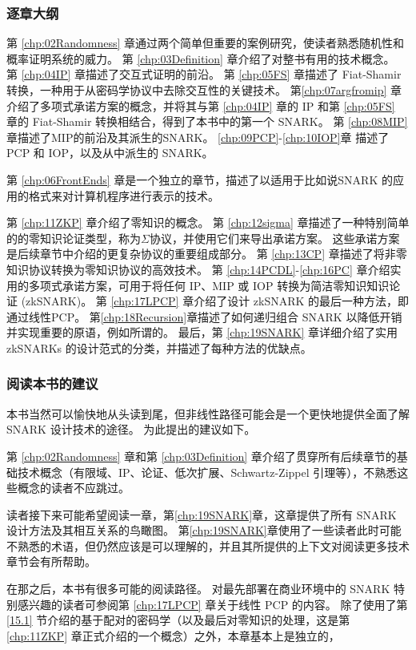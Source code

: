 \subsubsection{逐章大纲}
第 \ref{chp:02Randomness} 章通过两个简单但重要的案例研究，使读者熟悉随机性和概率证明系统的威力。 第 \ref{chp:03Definition} 章介绍了对整书有用的技术概念。 第 \ref{chp:04IP} 章描述了交互式证明的前沿。 第 \ref{chp:05FS} 章描述了 Fiat-Shamir 转换，一种用于从密码学协议中去除交互性的关键技术。 第\ref{chp:07argfromip} 章介绍了多项式承诺方案的概念，并将其与第 \ref{chp:04IP} 章的 IP 和第 \ref{chp:05FS} 章的 Fiat-Shamir 转换相结合，得到了本书中的第一个 SNARK。 第 \ref{chp:08MIP} 章描述了MIP的前沿及其派生的SNARK。 
\ref{chp:09PCP}-\ref{chp:10IOP}章 描述了 PCP 和 IOP，以及从中派生的 SNARK。

第 \ref{chp:06FrontEnds} 章是一个独立的章节，描述了以适用于比如说SNARK 的应用的格式来对计算机程序进行表示的技术。

第 \ref{chp:11ZKP} 章介绍了零知识的概念。 第 \ref{chp:12sigma} 章描述了一种特别简单的的零知识论证类型，称为$\Sigma$协议，并使用它们来导出承诺方案。 这些承诺方案是后续章节中介绍的更复杂协议的重要组成部分。 第 \ref{chp:13CP} 章描述了将非零知识协议转换为零知识协议的高效技术。 第 \ref{chp:14PCDL}-\ref{chp:16PC} 章介绍实用的多项式承诺方案，可用于将任何 IP、MIP 或 IOP 转换为简洁零知识知识论证 (zkSNARK)。 第 \ref{chp:17LPCP} 章介绍了设计 zkSNARK 的最后一种方法，即通过线性PCP。 第\ref{chp:18Recursion}章描述了如何递归组合 SNARK 以降低开销并实现重要的原语，例如所谓的。 最后，第 \ref{chp:19SNARK} 章详细介绍了实用 zkSNARKs 的设计范式的分类，并描述了每种方法的优缺点。


\subsubsection{阅读本书的建议} 本书当然可以愉快地从头读到尾，但非线性路径可能会是一个更快地提供全面了解 SNARK 设计技术的途径。 为此提出的建议如下。

第 \ref{chp:02Randomness} 章和第 \ref{chp:03Definition} 章介绍了贯穿所有后续章节的基础技术概念（有限域、IP、论证、低次扩展、Schwartz-Zippel 引理等），不熟悉这些概念的读者不应跳过。

读者接下来可能希望阅读一章，第\ref{chp:19SNARK}章，这章提供了所有 SNARK 设计方法及其相互关系的鸟瞰图。 第\ref{chp:19SNARK}章使用了一些读者此时可能不熟悉的术语，但仍然应该是可以理解的，并且其所提供的上下文对阅读更多技术章节会有所帮助。

在那之后，本书有很多可能的阅读路径。 对最先部署在商业环境中的 SNARK 特别感兴趣的读者可参阅第 \ref{chp:17LPCP} 章关于线性 PCP 的内容。 除了使用了第 \ref{15.1} 节介绍的基于配对的密码学（以及最后对零知识的处理，这是第 \ref{chp:11ZKP} 章正式介绍的一个概念）之外，本章基本上是独立的，

